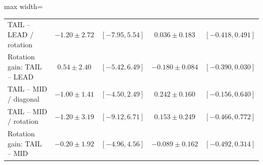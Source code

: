 \documentclass{article}
\begin{document}
\begin{table}[t]
\begin{adjustbox}{max width=\linewidth}
\begin{tabular}{lcccc}
TAIL -- LEAD / rotation & $-1.20 \pm 2.72$ & $[-7.95,5.54]$ & $0.036 \pm 0.183$ & $[-0.418,0.491]$ \\
Rotation gain: TAIL -- LEAD & $0.54 \pm 2.40$ & $[-5.42,6.49]$ & $-0.180 \pm 0.084$ & $[-0.390,0.030]$ \\
TAIL -- MID / diagonal & $-1.00 \pm 1.41$ & $[-4.50,2.49]$ & $0.242 \pm 0.160$ & $[-0.156,0.640]$ \\
TAIL -- MID / rotation & $-1.20 \pm 3.19$ & $[-9.12,6.71]$ & $0.153 \pm 0.249$ & $[-0.466,0.772]$ \\
Rotation gain: TAIL -- MID & $-0.20 \pm 1.92$ & $[-4.96,4.56]$ & $-0.089 \pm 0.162$ & $[-0.492,0.314]$ \\
\bottomrule
\end{tabular}
\end{adjustbox}
\end{table}
\end{document}
